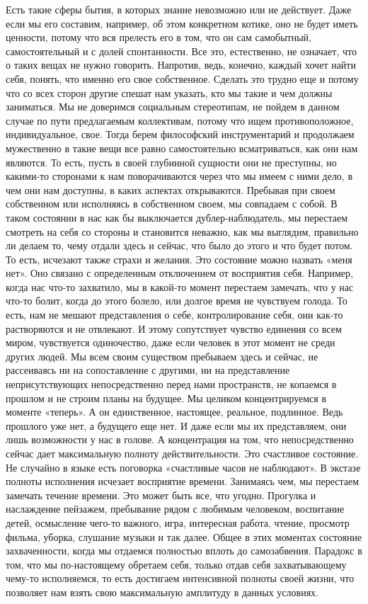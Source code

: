 Есть такие сферы бытия, в
которых знание невозможно или не действует. Даже если мы его составим, например,
об этом конкретном котике, оно не будет иметь ценности, потому что вся прелесть
его в том, что он сам самобытный, самостоятельный и с долей спонтанности. Все
это, естественно, не означает, что о таких вещах не нужно говорить. Напротив,
ведь, конечно, каждый хочет найти себя, понять, что именно его свое собственное.
Сделать это трудно еще и потому что со всех сторон другие спешат нам указать,
кто мы такие и чем должны заниматься. Мы не доверимся социальным стереотипам, не
пойдем в данном случае по пути предлагаемым коллективам, потому что ищем
противоположное, индивидуальное, свое. Тогда берем философский инструментарий и
продолжаем мужественно в такие вещи все равно самостоятельно всматриваться, как
они нам являются. То есть, пусть в своей глубинной сущности они не преступны, но
какими-то сторонами к нам поворачиваются через что мы имеем с ними дело, в чем
они нам доступны, в каких аспектах открываются. Пребывая при своем собственном
или исполняясь в собственном своем, мы совпадаем с собой. В таком состоянии в
нас как бы выключается дублер-наблюдатель, мы перестаем смотреть на себя со
стороны и становится неважно, как мы выглядим, правильно ли делаем то, чему
отдали здесь и сейчас, что было до этого и что будет потом. То есть, исчезают
также страхи и желания. Это состояние можно назвать «меня нет». Оно связано с
определенным отключением от восприятия себя. Например, когда нас что-то
захватило, мы в какой-то момент перестаем замечать, что у нас что-то болит,
когда до этого болело, или долгое время не чувствуем голода. То есть, нам не
мешают представления о себе, контролирование себя, они как-то растворяются и не
отвлекают. И этому сопутствует чувство единения со всем миром, чувствуется
одиночество, даже если человек в этот момент не среди других людей. Мы всем
своим существом пребываем здесь и сейчас, не рассеиваясь ни на сопоставление с
другими, ни на представление неприсутствующих непосредственно перед нами
пространств, не копаемся в прошлом и не строим планы на будущее. Мы целиком
концентрируемся в моменте «теперь». А он единственное, настоящее, реальное,
подлинное. Ведь прошлого уже нет, а будущего еще нет. И даже если мы их
представляем, они лишь возможности у нас в голове. А концентрация на том, что
непосредственно сейчас дает максимальную полноту действительности. Это
счастливое состояние. Не случайно в языке есть поговорка «счастливые часов не
наблюдают». В экстазе полноты исполнения исчезает восприятие времени. Занимаясь
чем, мы перестаем замечать течение времени. Это может быть все, что угодно.
Прогулка и наслаждение пейзажем, пребывание рядом с любимым человеком,
воспитание детей, осмысление чего-то важного, игра, интересная работа, чтение,
просмотр фильма, уборка, слушание музыки и так далее. Общее в этих моментах
состояние захваченности, когда мы отдаемся полностью вплоть до самозабвения.
Парадокс в том, что мы по-настоящему обретаем себя, только отдав себя
захватывающему чему-то исполняемся, то есть достигаем интенсивной полноты своей
жизни, что позволяет нам взять свою максимальную амплитуду в данных условиях.


